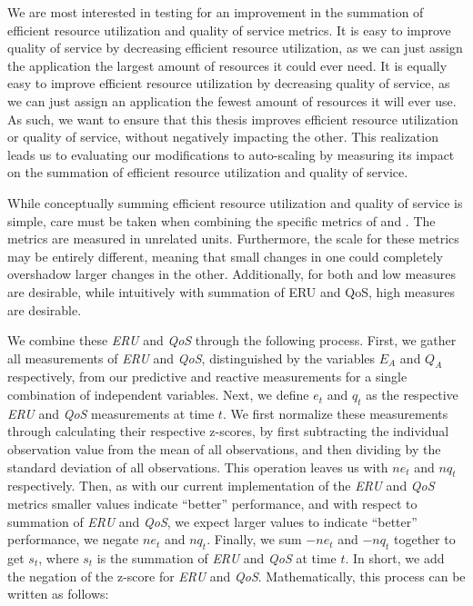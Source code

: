 We are most interested in testing for an improvement in the summation of
efficient resource utilization and quality of service metrics. It is
easy to improve quality of service by decreasing efficient resource
utilization, as we can just assign the application the largest amount of
resources it could ever need. It is equally easy to improve efficient resource
utilization by decreasing quality of service, as we can just assign an
application the fewest amount of resources it will ever use. As such, we want to
ensure that this thesis improves efficient resource utilization or quality of
service, without negatively impacting the other. This realization leads us to
evaluating our modifications to auto-scaling by measuring its impact on the
summation of efficient resource utilization and quality of service.

While conceptually summing efficient resource utilization and quality of service
is simple, care must be taken when combining the specific metrics of
 and . The metrics are measured in unrelated
units. Furthermore, the scale for these metrics may be entirely different,
meaning that small changes in one could completely overshadow larger changes in
the other. Additionally, for both  and  low
measures are desirable, while intuitively with summation of ERU and QoS, high
measures are desirable.

We combine these \textit{ERU} and \textit{QoS} through the following process.
First, we gather all measurements of \textit{ERU} and \textit{QoS},
distinguished by the variables $E_{A}$ and $Q_{A}$ respectively, from our
predictive and reactive measurements for a single combination of independent
variables. Next, we define $e_{t}$ and $q_{t}$ as the
respective \textit{ERU} and \textit{QoS} measurements at time $t$. We first
normalize these measurements through calculating their respective z-scores,
by first subtracting the individual observation value
from the mean of all observations, and then dividing by the standard deviation of all
observations. This operation leaves us with $ne_{t}$ and $nq_{t}$ respectively.
Then, as with our current implementation of the \textit{ERU} and \textit{QoS}
metrics smaller values indicate ``better'' performance, and with respect to
summation of \textit{ERU} and \textit{QoS}, we expect larger values to indicate
``better'' performance, we negate $ne_{t}$ and $nq_{t}$. Finally, we sum
$-ne_{t}$ and $-nq_{t}$ together to get $s_{t}$, where $s_{t}$ is the summation
of \textit{ERU} and \textit{QoS} at time $t$.
In short, we add the negation of the z-score for
\textit{ERU} and \textit{QoS}. Mathematically, this process can be written as
follows:

